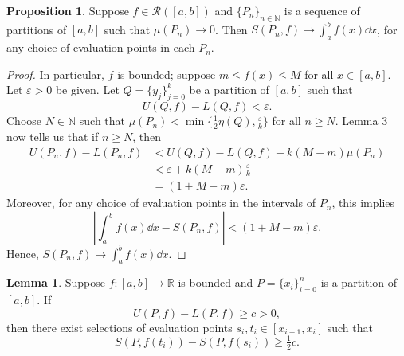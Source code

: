 \documentclass[12pt]{article}
\theoremstyle{definition}
\newtheorem{proposition}{Proposition}
\newtheorem{lemma}{Lemma}
\newcommand{\N}{\mathbb{N}}
\newcommand{\R}{\mathbb{R}}
\newcommand{\eps}{\varepsilon}
\begin{document}
\begin{proposition}
    Suppose $f \in \mathcal{R}([a,b])$ and $\{P_n\}_{n\in \N}$ is a sequence of partitions of $[a, b]$ such that $\mu(P_n) \to 0$. Then $S(P_n,f) \to \int_a^b f(x) \dd{x}$, for any choice of  evaluation points in each $P_n$.
\end{proposition}

\begin{proof}
    In particular, $f$ is bounded; suppose $m \leq f(x) \leq M$ for all $x \in [a, b]$. Let $\eps > 0$ be given. Let $Q = \{y_j\}_{j=0}^k$ be a partition of $[a, b]$ such that
    \[
        U(Q, f) - L(Q, f) < \eps.
    \]
    Choose $N \in \N$ such that $\mu(P_n) < \min\{\frac12\eta(Q), \frac{\eps}{k}\}$ for all $n \geq N$. Lemma 3 now tells us that if $n \geq N$, then
    \begin{align*}
        U(P_n, f) - L(P_n, f)
            &< U(Q, f) - L(Q, f) + k(M - m)\mu(P_n) \\
            &< \eps + k(M - m)\frac{\eps}{k} \\
            &= (1 + M - m)\eps.
    \end{align*}
    Moreover, for any choice of evaluation points in the intervals of $P_n$, this implies
    \[
        \left|\int_a^b f(x) \dd{x} - S(P_n, f)\right| < (1 + M - m)\eps.
    \]
    Hence, $S(P_n, f) \to \int_a^b f(x) \dd{x}$.
    
\end{proof}

\newpage
\begin{lemma}
    Suppose $f : [a, b] \to \R$ is bounded and $P = \{x_i\}_{i=0}^n$ is a partition of $[a, b]$. If
    \[
        U(P, f) - L(P, f) \geq c > 0,
    \]
    then there exist selections of evaluation points $s_i, t_i \in [x_{i-1}, x_i]$ such that
    \[
        S(P, f(t_i)) - S(P, f(s_i)) \geq \tfrac12 c.
    \]
    
\end{lemma}
\end{document}

